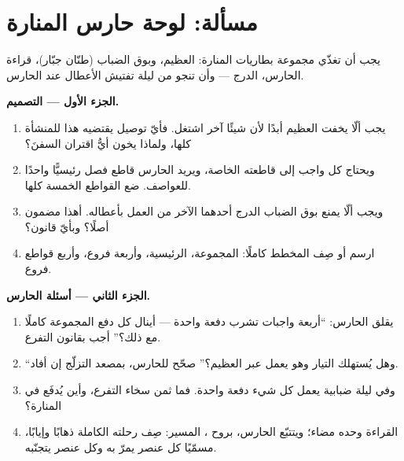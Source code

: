 \section{مسألة: لوحة حارس المنارة}

\begin{problem}\label{pb:g7:circuits-series-parallel:1}
يجب أن تغذّي مجموعة بطاريات المنارة:  العظيم، وبوق
الضباب (طنّان جبّار)،  قراءة الحارس،  الدرج ---
وأن تنجو من ليلة تفتيش الأعطال عند الحارس.

\medskip\noindent\textbf{الجزء الأول --- التصميم.}
\begin{enumerate}
  \item يجب ألّا يخفت  العظيم أبدًا لأن شيئًا آخر
        اشتغل. فأيّ توصيل يقتضيه هذا للمنشأة كلها، ولماذا يخون
        أيُّ اقتران  السفنَ؟
  \item ويحتاج كل واجب إلى قاطعته الخاصة، ويريد الحارس قاطع
        فصل رئيسيًّا واحدًا للعواصف. ضع القواطع الخمسة كلها.
  \item ويجب ألّا يمنع بوق الضباب  الدرج أحدهما الآخر من
        العمل بأعطاله. أهذا مضمون أصلًا؟ وبأيّ قانون؟
  \item ارسم أو صِف المخطط كاملًا: المجموعة، 
        الرئيسية، وأربعة فروع، وأربع قواطع فروع.
\end{enumerate}

\medskip\noindent\textbf{الجزء الثاني --- أسئلة الحارس.}
\begin{enumerate}[resume]
  \item يقلق الحارس: ``أربعة واجبات تشرب دفعة واحدة --- أينال
        كل  دفع المجموعة كاملًا مع ذلك؟'' أجب بقانون
        التفرع.
  \item ``وهل يُستهلك التيار وهو يعمل عبر  العظيم؟''
        صحّح للحارس، بمصعد التزلّج إن أفاد.
  \item وفي ليلة ضبابية يعمل كل شيء دفعة واحدة. فما ثمن سخاء
        التفرع، وأين يُدفَع في المنارة؟
  \item {} القراءة وحده مضاء؛ ويتتبّع الحارس، بروح
        ، المسير: صِف رحلته الكاملة ذهابًا وإيابًا،
        مسمّيًا كل عنصر يمرّ به وكل عنصر يتجنّبه.
\end{enumerate}


\end{problem}
